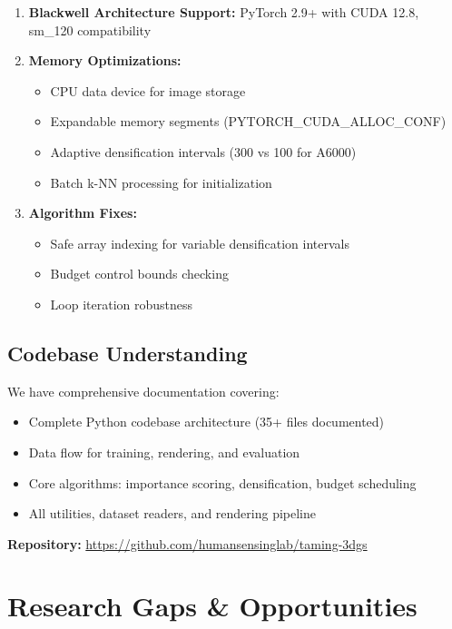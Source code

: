 \documentclass[11pt,letterpaper]{article}
\begin{document}
\begin{enumerate}[leftmargin=*]
    \item \textbf{Blackwell Architecture Support:} PyTorch 2.9+ with CUDA 12.8, sm\_120 compatibility
    \item \textbf{Memory Optimizations:}
    \begin{itemize}
        \item CPU data device for image storage
        \item Expandable memory segments (PYTORCH\_CUDA\_ALLOC\_CONF)
        \item Adaptive densification intervals (300 vs 100 for A6000)
        \item Batch k-NN processing for initialization
    \end{itemize}
    \item \textbf{Algorithm Fixes:}
    \begin{itemize}
        \item Safe array indexing for variable densification intervals
        \item Budget control bounds checking
        \item Loop iteration robustness
    \end{itemize}
\end{enumerate}

\subsection{Codebase Understanding}

We have comprehensive documentation covering:
\begin{itemize}[leftmargin=*]
    \item Complete Python codebase architecture (35+ files documented)
    \item Data flow for training, rendering, and evaluation
    \item Core algorithms: importance scoring, densification, budget scheduling
    \item All utilities, dataset readers, and rendering pipeline
\end{itemize}

\textbf{Repository:} \url{https://github.com/humansensinglab/taming-3dgs}

\section{Research Gaps \& Opportunities}
\end{document}
